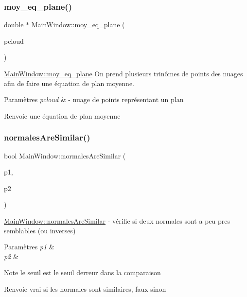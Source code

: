 \subsubsection{\texorpdfstring{moy\+\_\+eq\+\_\+plane()}{moy\_eq\_plane()}}
{\footnotesize\ttfamily double $\ast$ Main\+Window\+::moy\+\_\+eq\+\_\+plane (\begin{DoxyParamCaption}\item[{pcl\+::\+Point\+Cloud$<$ pcl\+::\+Point\+X\+YZ $>$}]{pcloud }\end{DoxyParamCaption})}



\hyperlink{classMainWindow_a270e2529573f70c73c0c96379add233d}{Main\+Window\+::moy\+\_\+eq\+\_\+plane} On prend plusieurs trinômes de points des nuages afin de faire une équation de plan moyenne. 


\begin{DoxyParams}{Paramètres}
{\em pcloud} & -\/ nuage de points représentant un plan \\
\hline
\end{DoxyParams}
\begin{DoxyReturn}{Renvoie}
une équation de plan moyenne 
\end{DoxyReturn}
\mbox{\label{classMainWindow_aa630d558c19d9e93bc8f3f0e2f591163}} 
\subsubsection{\texorpdfstring{normales\+Are\+Similar()}{normalesAreSimilar()}}
{\footnotesize\ttfamily bool Main\+Window\+::normales\+Are\+Similar (\begin{DoxyParamCaption}\item[{Q\+Vector3D}]{p1,  }\item[{Q\+Vector3D}]{p2 }\end{DoxyParamCaption})}



\hyperlink{classMainWindow_aa630d558c19d9e93bc8f3f0e2f591163}{Main\+Window\+::normales\+Are\+Similar} -\/ vérifie si deux normales sont a peu pres semblables (ou inverses) 


\begin{DoxyParams}{Paramètres}
{\em p1} & \\
\hline
{\em p2} & \\
\hline
\end{DoxyParams}
\begin{DoxyNote}{Note}
le seuil est le seuil d\textquotesingle{}erreur dans la comparaison 
\end{DoxyNote}
\begin{DoxyReturn}{Renvoie}
vrai si les normales sont similaires, faux sinon 
\end{DoxyReturn}
\mbox{\label{classMainWindow_a74c5655d5716cf30d2647c2a1cf757a4}} 
